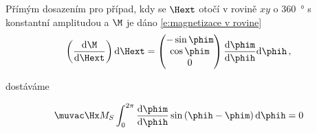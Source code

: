 Přímým dosazením pro případ, kdy se $\Hext$ otočí v rovině $xy$ o \SI{360}{\degree} s konstantní amplitudou a $\M$ je dáno \eqref{e:magnetizace v rovine}
\begin{equation}
    \left( \frac{\text{d}\M}{\text{d}\Hext} \right) \text{d}\Hext=\begin{pmatrix}
    -\sin \phim \\ \cos \phim \\ 0
    \end{pmatrix} \frac{\text{d}\phim}{\text{d}\phih}  \text{d}\phih \,,
\end{equation}

dostáváme

\begin{equation} \label{e:M integracni konstanta dodatek}
\muvac\Hx M_S \int_{0}^{2\pi}  \frac{\text{d}\phim}{\text{d}\phih} \sin\left(\phih-\phim\right) \text{d}\phih=0
\end{equation}
